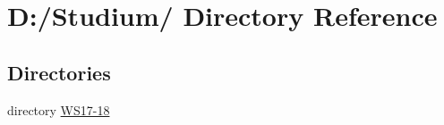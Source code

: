 \hypertarget{dir_D_3A_2FStudium_2F}{
\section{D:/Studium/ Directory Reference}
\label{dir_D_3A_2FStudium_2F}
}


\subsection*{Directories}
\begin{CompactItemize}
\item 
directory \hyperlink{dir_D_3A_2FStudium_2FWS17_2D18_2F}{WS17-18}
\end{CompactItemize}
